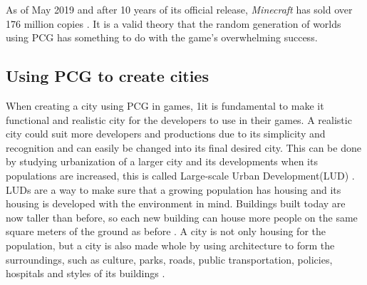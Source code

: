 As of May 2019 and after 10 years of its official release, \textit{Minecraft} has sold over 176 million copies \cite{Minecraft_10ys}. It is a valid theory that the random generation of worlds using PCG has something to do with the game's overwhelming success.


\subsection{Using PCG to create cities} %
When creating a city using PCG in games, 1it is fundamental to make it functional and realistic city for the developers to use in their games. A realistic city could suit more developers and productions due to its simplicity and recognition and can easily be changed into its final desired city. This can be done by studying urbanization of a larger city and its developments when its populations are increased, this is called Large-scale Urban Development(LUD) \cite{UrbanCity}. LUDs are a way to make sure that a growing population has housing and its housing is developed with the environment in mind. Buildings built today are now taller than before, so each new building can house more people on the same square meters of the ground as before \cite{UrbanCity}. A city is not only housing for the population, but a city is also made whole by using architecture to form the surroundings, such as culture, parks, roads, public transportation, policies, hospitals and styles of its buildings \cite{CityArchitecture}. 


